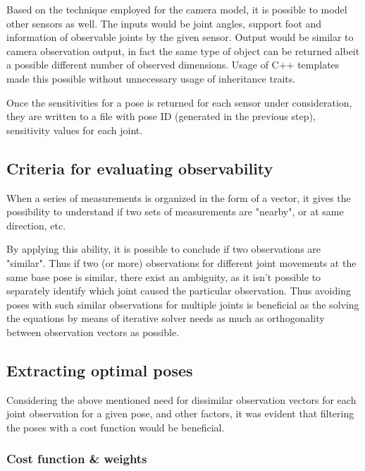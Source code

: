 \documentclass[english, printversion, nomenclature, notitle]{tuvisionthesis} %
\begin{document}
Based on the technique employed for the camera model, it is possible to model other sensors as well. The inputs would be joint angles, support foot and information of observable joints by the given sensor.
Output would be similar to camera observation output, in fact the same type of object can be returned albeit a possible different number of observed dimensions. Usage of C++ templates made this possible without unnecessary usage of inheritance traits. 

Once the sensitivities for a pose is returned for each sensor under consideration, they are written to a file with pose ID (generated in the previous step), sensitivity values for each joint. 
\subsection{Criteria for evaluating observability}

When a series of measurements is organized in the form of a vector, it gives the possibility to understand if two sets of measurements are "nearby", or at same direction, etc. 

By applying this ability, it is possible to conclude if two observations are "similar". Thus if two (or more) observations for different joint movements at the same base pose is similar, there exist an ambiguity, as it isn't possible to separately identify which joint caused the particular observation. Thus avoiding poses with such similar observations for multiple joints is beneficial as the solving the equations by means of iterative solver needs as much as orthogonality between observation vectors as possible.

\subsection{Extracting optimal poses}

Considering the above mentioned need for dissimilar observation vectors for each joint observation for a given pose, and other factors, it was evident that filtering the poses with a cost function would be beneficial.

\subsubsection{Cost function \& weights}

\end{document}
